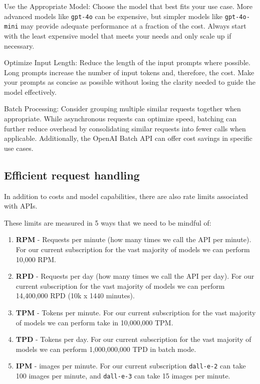 \documentclass[
  letterpaper,
  DIV=11,
  numbers=noendperiod]{scrreprt}
\providecommand{\tightlist}{%
  \setlength{\itemsep}{0pt}\setlength{\parskip}{0pt}}\usepackage{longtable,booktabs,array}
\begin{document}
Use the Appropriate Model: Choose the model that best fits your use
case. More advanced models like \texttt{gpt-4o} can be expensive, but
simpler models like \texttt{gpt-4o-mini} may provide adequate
performance at a fraction of the cost. Always start with the least
expensive model that meets your needs and only scale up if necessary.

Optimize Input Length: Reduce the length of the input prompts where
possible. Long prompts increase the number of input tokens and,
therefore, the cost. Make your prompts as concise as possible without
losing the clarity needed to guide the model effectively.

Batch Processing: Consider grouping multiple similar requests together
when appropriate. While asynchronous requests can optimize speed,
batching can further reduce overhead by consolidating similar requests
into fewer calls when applicable. Additionally, the OpenAI Batch API can
offer cost savings in specific use cases.

\subsection{Efficient request
handling}\label{efficient-request-handling}

In addition to costs and model capabilities, there are also rate limits
associated with APIs.

These limits are measured in 5 ways that we need to be mindful of:

\begin{enumerate}
\def\labelenumi{\arabic{enumi}.}
\tightlist
\item
  \textbf{RPM} - Requests per minute (how many times we call the API per
  minute). For our current subscription for the vast majority of models
  we can perform 10,000 RPM.
\item
  \textbf{RPD} - Requests per day (how many times we call the API per
  day). For our current subscription for the vast majority of models we
  can perform 14,400,000 RPD (10k x 1440 minutes).
\item
  \textbf{TPM} - Tokens per minute. For our current subscription for the
  vast majority of models we can perform take in 10,000,000 TPM.
\item
  \textbf{TPD} - Tokens per day. For our current subscription for the
  vast majority of models we can perform 1,000,000,000 TPD in batch
  mode.
\item
  \textbf{IPM} - images per minute. For our current subscription
  \texttt{dall-e-2} can take 100 images per minute, and
  \texttt{dall-e-3} can take 15 images per minute.
\end{enumerate}
\end{document}

